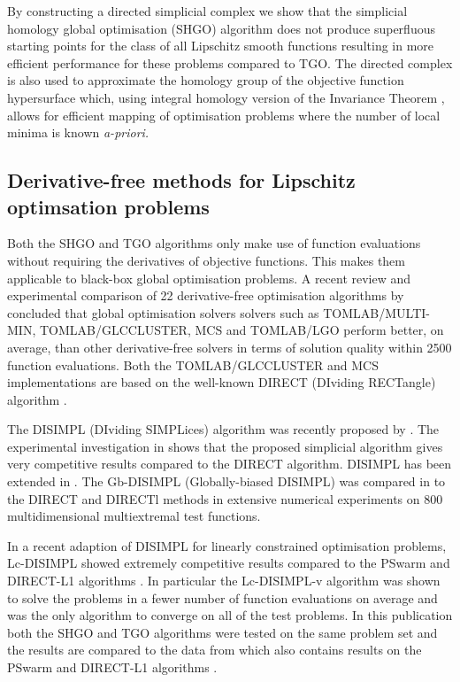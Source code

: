 By constructing a directed simplicial complex we show that the simplicial homology global optimisation (SHGO) algorithm does not produce superfluous starting points for the class of all Lipschitz smooth functions resulting in more efficient performance for these problems compared to TGO. The directed complex is also used to approximate the homology group of the objective function hypersurface which, using integral homology version of the Invariance Theorem \cite{Henle1979}, allows for efficient mapping of optimisation problems where the number of local minima is known \it{a-priori}\normalfont. %

\subsection{Derivative-free methods for Lipschitz optimsation problems}
Both the SHGO and TGO algorithms only make use of function evaluations without requiring the derivatives of objective functions. This makes them applicable to black-box global optimisation problems. A recent review and experimental comparison of 22 derivative-free optimisation algorithms by \citet{Rios2013} concluded that global optimisation solvers solvers such as TOMLAB/MULTI-MIN, TOMLAB/GLCCLUSTER, MCS and TOMLAB/LGO perform better, on average, than other derivative-free solvers in terms of solution quality within 2500 function evaluations. Both the TOMLAB/GLCCLUSTER and MCS \cite{Huyer1999} implementations are based on the well-known DIRECT (DIviding RECTangle) algorithm \cite{Jones1993}.
 
The DISIMPL (DIviding SIMPLices) algorithm was recently proposed by \citet{Paul2014b}. The experimental investigation in \cite{Paul2014b} shows that the proposed simplicial algorithm gives very competitive results compared to the DIRECT algorithm. DISIMPL has been extended in \cite{paulavivcius2014simplicial, Paul2014a}. The Gb-DISIMPL (Globally-biased DISIMPL) was compared in \cite{Paul2014a} to the DIRECT and DIRECTl methods in extensive numerical experiments on 800 multidimensional multiextremal test functions.

In a recent adaption of DISIMPL for linearly constrained optimisation problems, Lc-DISIMPL \cite{Paul2016} showed extremely competitive results compared to the PSwarm \cite{Vaz2008} and DIRECT-L1 algorithms \cite{finkel2003direct}. In particular the Lc-DISIMPL-v algorithm was shown to solve the problems in a fewer number of function evaluations on average and was the only algorithm to converge on all of the test problems. In this publication both the SHGO and TGO algorithms were tested on the same problem set and the results are compared to the data from \cite{Paul2016} which also contains results on the PSwarm \cite{Vaz2008} and DIRECT-L1 algorithms \cite{finkel2003direct}.

